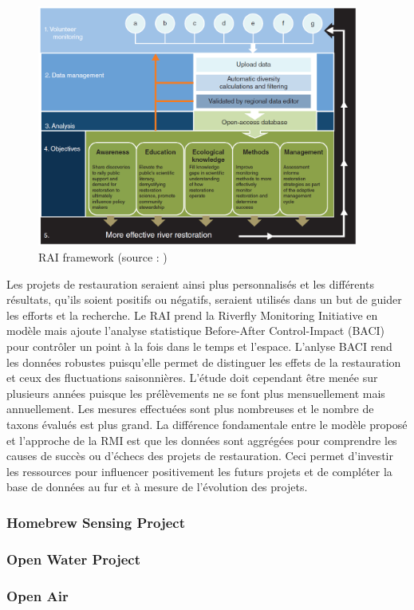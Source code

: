 \documentclass[10pt, conference, compsocconf]{llncs}
\begin{document}
			\begin{figure}
				\begin{center}
					\includegraphics[width=300pt]{RAI.png}
				\end{center}
				\caption{RAI framework (source : \cite{hudart})}
			\end{figure}
			Les projets de restauration seraient ainsi plus personnalisés et les différents résultats, qu'ils soient positifs ou négatifs, seraient utilisés dans un but de guider les efforts et la recherche.
			Le RAI prend la Riverfly Monitoring Initiative en modèle mais ajoute l'analyse statistique Before-After Control-Impact (BACI) pour contrôler un point à la fois dans le temps et l'espace. L'anlyse BACI rend les données robustes puisqu'elle permet de distinguer les effets de la restauration et ceux des fluctuations saisonnières. L'étude doit cependant être menée sur plusieurs années puisque les prélèvements ne se font plus mensuellement mais annuellement. Les mesures effectuées sont plus nombreuses et le nombre de taxons évalués est plus grand. La différence fondamentale entre le modèle proposé et l'approche de la RMI est que les données sont aggrégées pour comprendre les causes de succès ou d'échecs des projets de restauration. Ceci permet d'investir les ressources pour influencer positivement les futurs projets et de compléter la base de données au fur et à mesure de l'évolution des projets.
		\subsubsection{Homebrew Sensing Project}
		\subsubsection{Open Water Project}
		\subsubsection{Open Air}
\end{document}
